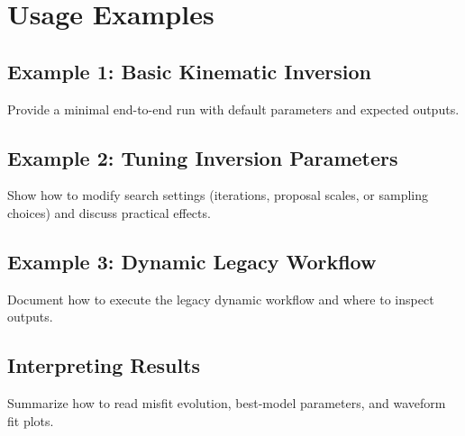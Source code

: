 \chapter{Usage Examples}

\section{Example 1: Basic Kinematic Inversion}
Provide a minimal end-to-end run with default parameters and expected outputs.

\section{Example 2: Tuning Inversion Parameters}
Show how to modify search settings (iterations, proposal scales, or sampling choices) and discuss practical effects.

\section{Example 3: Dynamic Legacy Workflow}
Document how to execute the legacy dynamic workflow and where to inspect outputs.

\section{Interpreting Results}
Summarize how to read misfit evolution, best-model parameters, and waveform fit plots.

